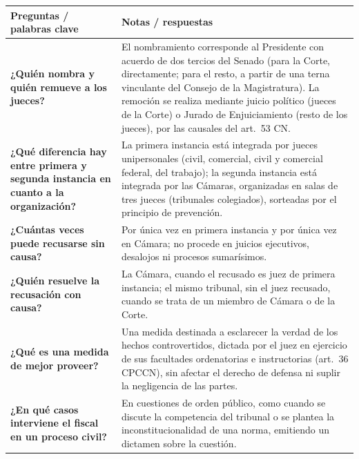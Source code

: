 \documentclass[12pt,oneside]{book}
\begin{document}
\begin{table}[H]
\centering
\begin{tabularx}{\textwidth}{
    >{\raggedright\arraybackslash}p{}
    >{\raggedright\arraybackslash}X
}
\toprule
\textbf{Preguntas / palabras clave} & \textbf{Notas / respuestas} \\
\midrule

\textbf{¿Quién nombra y quién remueve a los jueces?} &
El nombramiento corresponde al Presidente con acuerdo de dos tercios del Senado (para la Corte, directamente; para el resto, a partir de una terna vinculante del Consejo de la Magistratura). La remoción se realiza mediante juicio político (jueces de la Corte) o Jurado de Enjuiciamiento (resto de los jueces), por las causales del art.\ 53 CN. \\

\textbf{¿Qué diferencia hay entre primera y segunda instancia en cuanto a la organización?} &
La primera instancia está integrada por jueces unipersonales (civil, comercial, civil y comercial federal, del trabajo); la segunda instancia está integrada por las Cámaras, organizadas en salas de tres jueces (tribunales colegiados), sorteadas por el principio de prevención. \\

\textbf{¿Cuántas veces puede recusarse sin causa?} &
Por única vez en primera instancia y por única vez en Cámara; no procede en juicios ejecutivos, desalojos ni procesos sumarísimos. \\

\textbf{¿Quién resuelve la recusación con causa?} &
La Cámara, cuando el recusado es juez de primera instancia; el mismo tribunal, sin el juez recusado, cuando se trata de un miembro de Cámara o de la Corte. \\

\textbf{¿Qué es una medida de mejor proveer?} &
Una medida destinada a esclarecer la verdad de los hechos controvertidos, dictada por el juez en ejercicio de sus facultades ordenatorias e instructorias (art.\ 36 CPCCN), sin afectar el derecho de defensa ni suplir la negligencia de las partes. \\

\textbf{¿En qué casos interviene el fiscal en un proceso civil?} &
En cuestiones de orden público, como cuando se discute la competencia del tribunal o se plantea la inconstitucionalidad de una norma, emitiendo un dictamen sobre la cuestión. \\


\end{tabularx}
\end{table}
\end{document}
